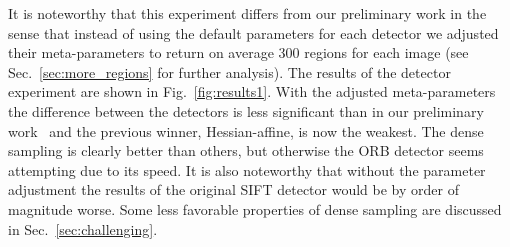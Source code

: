 \documentclass[10pt,journal,cspaper,compsoc]{IEEEtran}
\begin{document}
%
It is noteworthy that this experiment differs from our preliminary work
in the sense that instead of using the default parameters for each detector
we adjusted their meta-parameters to return on average 300 regions for
each image (see Sec.~\ref{sec:more_regions} for further analysis).
The results of the detector experiment  are shown in Fig.~\ref{fig:results1}.
With the adjusted meta-parameters the difference between the detectors
is less significant than in our preliminary work~\cite{LanKanKam:2012} and
the previous winner, Hessian-affine, is now the weakest. The dense sampling
is clearly better than others, but otherwise the ORB detector seems
attempting due to its speed. It is also noteworthy that without the parameter
adjustment the results of the original SIFT detector would be by order of
magnitude worse.
Some less favorable
properties of dense sampling are discussed in Sec.~\ref{sec:challenging}.
\end{document}
